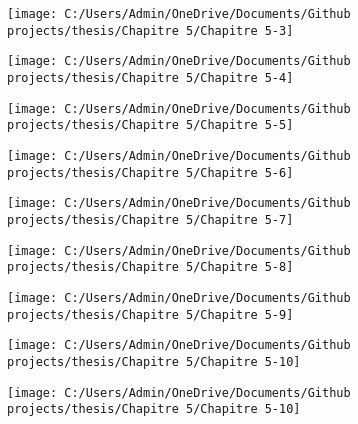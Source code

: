 \documentclass[
  english,
  man]{apa6}
\begin{document}
\begin{center}\texttt{[image: C:/Users/Admin/OneDrive/Documents/Github projects/thesis/Chapitre 5/Chapitre 5-3]} \end{center}

\begin{center}\texttt{[image: C:/Users/Admin/OneDrive/Documents/Github projects/thesis/Chapitre 5/Chapitre 5-4]} \end{center}

\begin{center}\texttt{[image: C:/Users/Admin/OneDrive/Documents/Github projects/thesis/Chapitre 5/Chapitre 5-5]} \end{center}

\begin{center}\texttt{[image: C:/Users/Admin/OneDrive/Documents/Github projects/thesis/Chapitre 5/Chapitre 5-6]} \end{center}

\begin{center}\texttt{[image: C:/Users/Admin/OneDrive/Documents/Github projects/thesis/Chapitre 5/Chapitre 5-7]} \end{center}

\begin{center}\texttt{[image: C:/Users/Admin/OneDrive/Documents/Github projects/thesis/Chapitre 5/Chapitre 5-8]} \end{center}

\begin{center}\texttt{[image: C:/Users/Admin/OneDrive/Documents/Github projects/thesis/Chapitre 5/Chapitre 5-9]} \end{center}

\begin{center}\texttt{[image: C:/Users/Admin/OneDrive/Documents/Github projects/thesis/Chapitre 5/Chapitre 5-10]} \end{center}

\begin{center}\texttt{[image: C:/Users/Admin/OneDrive/Documents/Github projects/thesis/Chapitre 5/Chapitre 5-10]} \end{center}
\end{document}
